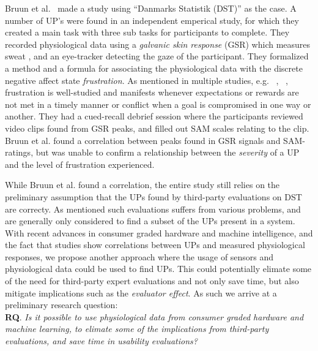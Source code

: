 Bruun et al.~\cite{LH-paper} made a study using ``Danmarks Statistik (DST)'' as the case.
A number of UP's were found in an independent emperical study, for which they created a main task with three sub tasks for participants to complete.
They recorded physiological data using a \textit{galvanic skin response} (GSR) which measures sweat \cite{gsr_calibration}, and an eye-tracker detecting the gaze of the participant.
They formalized a method and a formula for associating the physiological data with the discrete negative affect state \textit{frustration}.
As mentioned in multiple studies, e.g. ~\cite{LH-paper}, ~\cite{frustration_with_computers}, frustration is well-studied
and manifests whenever expectations or rewards are not met in a timely manner or conflict when a goal is compromised in one way or another.
They had a cued-recall debrief session where the participants reviewed video clips found from GSR peaks, and filled out SAM scales relating to the clip. 
Bruun et al. found a correlation between peaks found in GSR signals and SAM-ratings, but was unable to confirm a relationship between the
\textit{severity} of a UP and the level of frustration experienced.

While Bruun et al. found a correlation, the entire study still relies on the preliminary assumption that the UPs found by third-party evaluations on DST are correcty. 
As mentioned such evaluations suffers from various problems, and are generally only considered to find a subset of the UPs present in a system. 
With recent advances in consumer graded hardware and machine intelligence, and the fact that studies show correlations between UPs and measured physiological responses, we propose another approach where the usage of sensors and physiological data could be used to find UPs.
This could potentially elimate some of the need for third-party expert evaluations and not only save time, but also mitigate implications such as the \textit{evaluator effect}\cite{eval_effect}.
As such we arrive at a preliminary research question:\\

\textbf{RQ}. \textit{Is it possible to use physiological data from consumer graded hardware and machine learning, to elimate some of the implications from third-party evaluations, and save time in usability evaluations?}

